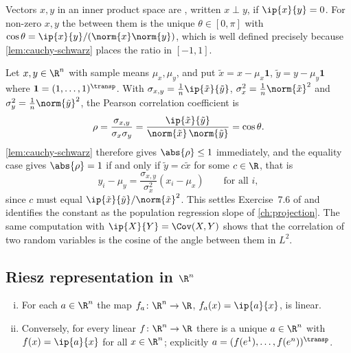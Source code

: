 \begin{definition}\label{def:orthogonality}
	Vectors $x,y$ in an inner product space are , written
	$x\perp y$, if $\ip{x}{y}=0$. For non-zero $x,y$ the  between them is
	the unique $\theta\in[0,\pi]$ with
	$\cos\theta=\ip{x}{y}/(\norm{x}\norm{y})$, which is well defined precisely
	because \autoref{lem:cauchy-schwarz} places the ratio in $[-1,1]$.
\end{definition}

\begin{eg}\label{eg:correlation-cosine}
	Let $x,y\in\R^n$ with sample means $\mu_x,\mu_y$, and put
	$\tilde x=x-\mu_x\mathbf{1}$, $\tilde y=y-\mu_y\mathbf{1}$ where
	$\mathbf 1=(1,\dots,1)^{\transp}$. With
	$\sigma_{x,y}=\frac1n\ip{\tilde x}{\tilde y}$,
	$\sigma_x^2=\frac1n\norm{\tilde x}^2$ and $\sigma^2_y=\frac1n\norm{\tilde y}^2$,
	the Pearson correlation coefficient is
	\[
		\rho=\frac{\sigma_{x,y}}{\sigma_x\sigma_y}
		=\frac{\ip{\tilde x}{\tilde y}}{\norm{\tilde x}\,\norm{\tilde y}}
		=\cos\theta .
	\]
	\autoref{lem:cauchy-schwarz} therefore gives $\abs{\rho}\leq1$ immediately, and
	the equality case gives $\abs{\rho}=1$ if and only if $\tilde y=c\tilde x$ for
	some $c\in\R$, that is
	\[
		y_i-\mu_y=\frac{\sigma_{x,y}}{\sigma_x^2}(x_i-\mu_x)
		\qquad\text{for all }i,
	\]
	since $c$ must equal $\ip{\tilde x}{\tilde y}/\norm{\tilde x}^2$. This settles
	Exercise~7.6 of \autocite[slide 18]{fukuda2026analysis} and identifies the
	constant as the population regression slope of \autoref{ch:projection}. The same
	computation with $\ip{X}{Y}=\Cov(X,Y)$ shows that the correlation of two random
	variables is the cosine of the angle between them in $L^2$.
\end{eg}

\subsection{Riesz representation in \texorpdfstring{$\R^n$}{Rn}}

\begin{theorem}\label{thm:riesz-rn}
	\begin{enumerate}[(i)]
		\item For each $a\in\R^n$ the map $f_a\colon\R^n\to\R$, $f_a(x)=\ip{a}{x}$, is
		      linear.
		\item Conversely, for every linear $f\colon\R^n\to\R$ there is a unique
		      $a\in\R^n$ with $f(x)=\ip{a}{x}$ for all $x\in\R^n$; explicitly
		      $a=(f(e^1),\dots,f(e^n))^{\transp}$.
	\end{enumerate}
\end{theorem}

